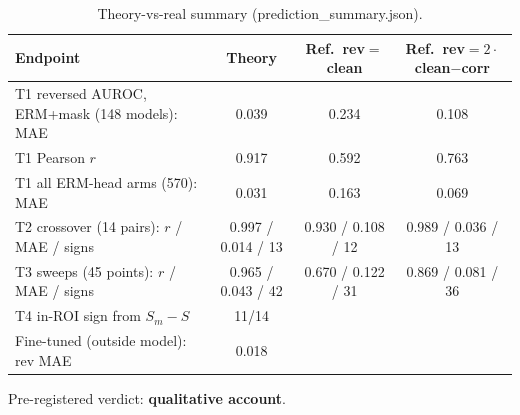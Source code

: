 \begin{table}[H]\centering\small\caption{Theory-vs-real summary (prediction\_summary.json).}\label{tab:theorys}\begin{tabular}{lccc}\toprule Endpoint & Theory & Ref.\ rev$=$clean & Ref.\ rev$=2\cdot$clean$-$corr\\
\midrule
T1 reversed AUROC, ERM+mask (148 models): MAE & 0.039 & 0.234 & 0.108\\
T1 Pearson $r$ & 0.917 & 0.592 & 0.763\\
T1 all ERM-head arms (570): MAE & 0.031 & 0.163 & 0.069\\
T2 crossover (14 pairs): $r$ / MAE / signs & 0.997 / 0.014 / 13 & 0.930 / 0.108 / 12 & 0.989 / 0.036 / 13\\
T3 sweeps (45 points): $r$ / MAE / signs & 0.965 / 0.043 / 42 & 0.670 / 0.122 / 31 & 0.869 / 0.081 / 36\\
T4 in-ROI sign from $S_m-S$ & 11/14 & & \\
Fine-tuned (outside model): rev MAE & 0.018 & & \\
\bottomrule\end{tabular}\par\smallskip Pre-registered verdict: \textbf{qualitative account}.\end{table}
